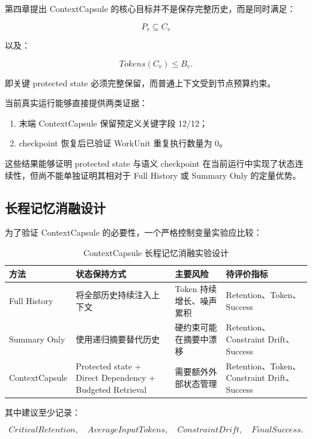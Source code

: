 \documentclass[UTF8,a4paper,12pt,oneside]{ctexbook}
\begin{document}
第四章提出 ContextCapsule 的核心目标并不是保存完整历史，而是同时满足：

\[
P_v\subseteq C_v
\]

以及：

\[
Tokens(C_v)\leq B_v.
\]

即关键 protected state 必须完整保留，而普通上下文受到节点预算约束。

当前真实运行能够直接提供两类证据：

\begin{enumerate}
    \item 末端 ContextCapsule 保留预定义关键字段 12/12；
    \item checkpoint 恢复后已验证 WorkUnit 重复执行数量为 0。
\end{enumerate}

这些结果能够证明 protected state 与语义 checkpoint 在当前运行中实现了状态连续性，但尚不能单独证明其相对于 Full History 或 Summary Only 的定量优势。


\subsection{长程记忆消融设计}

为了验证 ContextCapsule 的必要性，一个严格控制变量实验应比较：

\begin{table}[htbp]
\centering
\caption{ContextCapsule 长程记忆消融实验设计}
\label{tab:memory-ablation}
\begin{tabularx}{0.96\textwidth}{p{}X X X}
\toprule
方法 & 状态保持方式 & 主要风险 & 待评价指标\\
\midrule

Full History
& 将全部历史持续注入上下文
& Token 持续增长、噪声累积
& Retention、Token、Success\\

Summary Only
& 使用递归摘要替代历史
& 硬约束可能在摘要中漂移
& Retention、Constraint Drift、Success\\

ContextCapsule
& Protected state + Direct Dependency + Budgeted Retrieval
& 需要额外外部状态管理
& Retention、Token、Constraint Drift、Success\\

\bottomrule
\end{tabularx}
\end{table}

其中建议至少记录：

\[
CriticalRetention,
\quad
AverageInputTokens,
\quad
ConstraintDrift,
\quad
FinalSuccess.
\]
\end{document}
